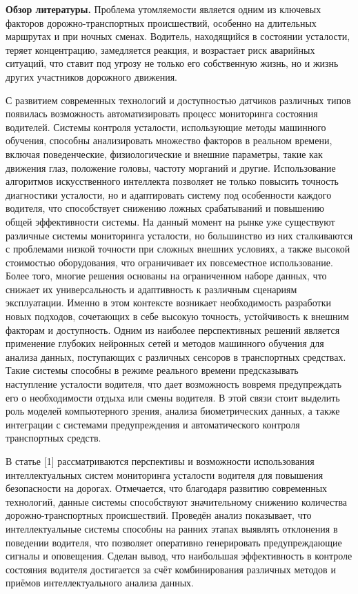 {\bfseries Обзор литературы.} Проблема утомляемости является одним из
ключевых факторов дорожно-транспортных происшествий, особенно на
длительных маршрутах и при ночных сменах. Водитель, находящийся в
состоянии усталости, теряет концентрацию, замедляется реакция, и
возрастает риск аварийных ситуаций, что ставит под угрозу не только его
собственную жизнь, но и жизнь других участников дорожного движения.

С развитием современных технологий и доступностью датчиков различных
типов появилась возможность автоматизировать процесс мониторинга
состояния водителей. Системы контроля усталости, использующие методы
машинного обучения, способны анализировать множество факторов в реальном
времени, включая поведенческие, физиологические и внешние параметры,
такие как движения глаз, положение головы, частоту морганий и другие.
Использование алгоритмов искусственного интеллекта позволяет не только
повысить точность диагностики усталости, но и адаптировать систему под
особенности каждого водителя, что способствует снижению ложных
срабатываний и повышению общей эффективности системы. На данный момент
на рынке уже существуют различные системы мониторинга усталости, но
большинство из них сталкиваются с проблемами низкой точности при сложных
внешних условиях, а также высокой стоимостью оборудования, что
ограничивает их повсеместное использование. Более того, многие решения
основаны на ограниченном наборе данных, что снижает их универсальность и
адаптивность к различным сценариям эксплуатации. Именно в этом контексте
возникает необходимость разработки новых подходов, сочетающих в себе
высокую точность, устойчивость к внешним факторам и доступность. Одним
из наиболее перспективных решений является применение глубоких нейронных
сетей и методов машинного обучения для анализа данных, поступающих с
различных сенсоров в транспортных средствах. Такие системы способны в
режиме реального времени предсказывать наступление усталости водителя,
что дает возможность вовремя предупреждать его о необходимости отдыха
или смены водителя. В этой связи стоит выделить роль моделей
компьютерного зрения, анализа биометрических данных, а также интеграции
с системами предупреждения и автоматического контроля транспортных
средств.

В статье {[}1{]} рассматриваются перспективы и возможности использования
интеллектуальных систем мониторинга усталости водителя для повышения
безопасности на дорогах. Отмечается, что благодаря развитию современных
технологий, данные системы способствуют значительному снижению
количества дорожно-транспортных происшествий. Проведён анализ
показывает, что интеллектуальные системы способны на ранних этапах
выявлять отклонения в поведении водителя, что позволяет оперативно
генерировать предупреждающие сигналы и оповещения. Сделан вывод, что
наибольшая эффективность в контроле состояния водителя достигается за
счёт комбинирования различных методов и приёмов интеллектуального
анализа данных.

